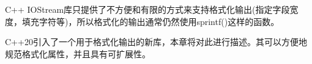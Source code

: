 C++ IOStream库只提供了不方便和有限的方式来支持格式化输出(指定字段宽度，填充字符等)，所以格式化的输出通常仍然使用sprintf()这样的函数。

C++20引入了一个用于格式化输出的新库，本章将对此进行描述。其可以方便地规范格式化属性，并且具有可扩展性。